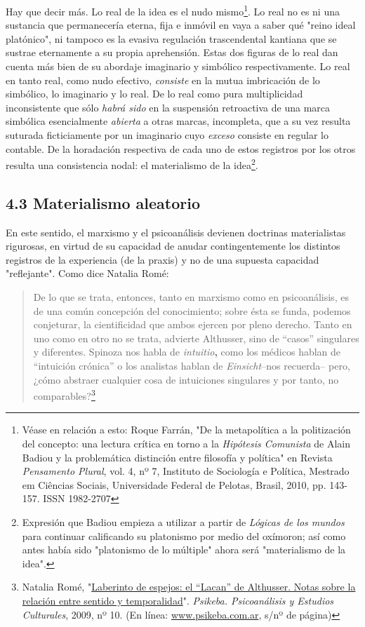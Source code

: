 \documentclass{book}
\begin{document}
Hay que decir más. Lo real de la idea es el nudo mismo\footnote{Véase en
  relación a esto: Roque Farrán, "De la metapolítica a la politización
  del concepto: una lectura crítica en torno a la \emph{Hipótesis
  Comunista} de Alain Badiou y la problemática distinción entre
  filosofía y política" en Revista \emph{Pensamento Plural}, vol. 4, nº
  7, Instituto de Sociología e Política, Mestrado em Ciências Sociais,
  Universidade Federal de Pelotas, Brasil, 2010, pp. 143-157. ISSN
  1982-2707}. Lo real no es ni una sustancia que permanecería eterna,
fija e inmóvil en vaya a saber qué "reino ideal platónico", ni tampoco
es la evasiva regulación trascendental kantiana que se sustrae
eternamente a su propia aprehensión. Estas dos figuras de lo real dan
cuenta más bien de su abordaje imaginario y simbólico respectivamente.
Lo real en tanto real, como nudo efectivo, \emph{consiste} en la mutua
imbricación de lo simbólico, lo imaginario y lo real. De lo real como
pura multiplicidad inconsistente que sólo \emph{habrá sido} en la
suspensión retroactiva de una marca simbólica esencialmente
\emph{abierta} a otras marcas, incompleta, que a su vez resulta suturada
ficticiamente por un imaginario cuyo \emph{exceso} consiste en regular
lo contable. De la horadación respectiva de cada uno de estos registros
por los otros resulta una consistencia nodal: el materialismo de la
idea\footnote{Expresión que Badiou empieza a utilizar a partir de
  \emph{Lógicas de los mundos} para continuar calificando su platonismo
  por medio del oxímoron; así como antes había sido "platonismo de lo
  múltiple" ahora será "materialismo de la idea".}.

\subsection{4.3 Materialismo aleatorio}

En este sentido, el marxismo y el psicoanálisis devienen doctrinas
materialistas rigurosas, en virtud de su capacidad de anudar
contingentemente los distintos registros de la experiencia (de la
praxis) y no de una supuesta capacidad "reflejante". Como dice Natalia
Romé:

\begin{quote}
De lo que se trata, entonces, tanto en marxismo como en psicoanálisis,
es de una común concepción del conocimiento; sobre ésta se funda,
podemos conjeturar, la cientificidad que ambos ejercen por pleno
derecho. Tanto en uno como en otro no se trata, advierte Althusser, sino
de ``casos'' singulares y diferentes. Spinoza nos habla de
\emph{intuitio}\textbf{,} como los médicos hablan de ``intuición
crónica'' o los analistas hablan de \emph{Einsicht}--nos recuerda--
pero, ¿cómo abstraer cualquier cosa de intuiciones singulares y por
tanto, no comparables?\footnote{Natalia Romé,
  "\href{http://www.psikeba.com.ar/articulos2/NR_el_Lacan_de_Althusser.htm}{Laberinto
  de espejos: el ``Lacan'' de Althusser. Notas sobre la relación entre
  sentido y temporalidad}". \emph{Psikeba. Psicoanálisis y Estudios
  Culturales}, 2009, nº 10. (En línea:
  \href{http://www.psikeba.com.ar/}{www.psikeba.com.ar}, s/nº de página)}
\end{quote}
\end{document}
